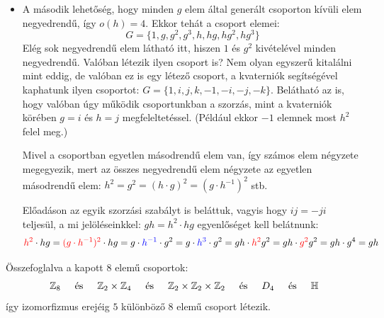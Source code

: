 \documentclass[12pt]{book}
\theoremstyle{plain} %
\theoremstyle{definition} %
\theoremstyle{remark}
\numberwithin{equation}{section}  %
\def\Z{\mathbb{Z}}
\def\Kv{\mathbb{H}}
\begin{document}
\begin{itemize}
{\begin{itemize}
				Amennyiben $h^{-1} \cdot g \cdot h = g$ akkor $g\cdot h = h \cdot g$ vagyis a csoport kommutatív, azokat már láttuk.
				
				Maradt $h^{-1} \cdot g \cdot h = g^3 = g^{-1}$ lehetőség, vagyis amikor $g\cdot h = h \cdot g^{-1}$. Ez éppen a diédercsoport számolási szabálya, ekkor: $G\cong D_4$.
				
				\item A második lehetőség, hogy minden $g$ elem által generált csoporton kívüli elem negyedrendű, így $o(h) = 4$. Ekkor tehát a csoport elemei:
				\[ G=\{1, g, g^2, g^3, h, hg, hg^2, hg^3 \} \]
				Elég sok negyedrendű elem látható itt, hiszen $1$ és $g^2$ kivételével minden negyedrendű. Valóban létezik ilyen csoport is? Nem olyan egyszerű kitalálni mint eddig, de valóban ez is egy létező csoport, a kvaterniók segítségével kaphatunk ilyen csoportot: $G=\{1, i, j, k, -1, -i, -j, -k\}$. Belátható az is, hogy valóban úgy működik csoportunkban a szorzás, mint a kvaterniók körében $g=i$ és $h=j$ megfeleltetéssel. (Például ekkor $-1$ elemnek most $h^2$ felel meg.)
				
				Mivel a csoportban egyetlen másodrendű elem van, így számos elem négyzete megegyezik, mert az összes negyedrendű elem négyzete az egyetlen másodrendű elem: $h^2 = g^2 = (h\cdot g)^2 = (g\cdot h^{-1})^2$ stb.
				
				Előadáson az egyik szorzási szabályt is beláttuk, vagyis hogy $ij=-ji$ teljesül, a mi jelöléseinkkel: $gh=h^2\cdot hg$ egyenlőséget kell belátnunk:
				\[ \color{red}h^2\color{black} \cdot hg = \color{red}(g\cdot h^{-1})^2\color{black} \cdot hg = g\cdot \color{blue} h^{-1} \color{black} \cdot g^2 = g\cdot \color{blue}h^3\color{black} \cdot g^2 = g h \cdot \color{red} h^2 \color{black} g^2 = gh \cdot \color{red} g^2 \color{black} g^2 = gh\cdot g^4 = gh   \] 
			\end{itemize}
		Összefoglalva a kapott $8$ elemű csoportok:
		\[ \Z_8 \hspace{5mm} \text{és} \hspace{5mm} \Z_2\times \Z_4 \hspace{5mm} \text{és} \hspace{5mm} \Z_2\times \Z_2 \times \Z_2 \hspace{5mm} \text{és} \hspace{5mm} D_4 \hspace{5mm} \text{és} \hspace{5mm} \Kv \]
		így izomorfizmus erejéig $5$ különböző $8$ elemű csoport létezik.
	}
	\end{itemize}
	
\end{document}
